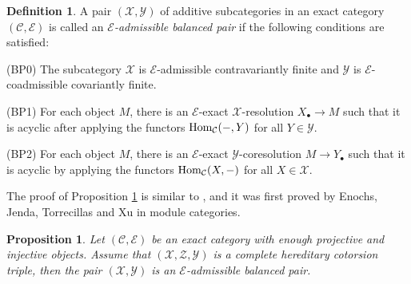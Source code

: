 \documentclass[reqno,12pt]{amsart}
\numberwithin{equation}{section}
\theoremstyle{plain}
\newtheorem{proposition}[theorem]{\bf Proposition}
\theoremstyle{definition}
\newtheorem{definition}[theorem]{\bf Definition}
\begin{document}
\begin{definition}
    A pair $(\mathcal{X},\mathcal{Y})$ of additive subcategories in an exact category
    $(\mathcal{C},\mathcal{E})$ is called an {\it $\mathcal{E}$-admissible balanced pair} if
    the following conditions are satisfied:

    {\rm (BP0)} The subcategory $\mathcal{X}$ is $\mathcal{E}$-admissible contravariantly
    finite and $\mathcal{Y}$ is $\mathcal{E}$-coadmissible covariantly finite.

    {\rm (BP1)} For each object $M$, there is an $\mathcal{E}$-exact $\mathcal{X}$-resolution
    $X_{\bullet}\to M$ such that it is acyclic after applying the functors
    $\mbox{\rm Hom}_{\mathcal{C}}(-,Y)$ for all $Y\in\mathcal{Y}$.

    {\rm (BP2)} For each object $M$, there is an $\mathcal{E}$-exact
    $\mathcal{Y}$-coresolution $M\to Y_{\bullet}$ such that it is acyclic by applying the
    functors $\mbox{\rm Hom}_{\mathcal{C}}(X,-)$ for all $X\in\mathcal{X}$.
\end{definition}
The proof of Proposition \ref{prop-2} is similar to \cite[Proposition 2.6]{C10}, and it was first proved by Enochs, Jenda, Torrecillas and Xu in module categories.
\begin{proposition}\label{prop-2}
    Let $(\mathcal{C},\mathcal{E})$ be an exact category with enough projective and injective
    objects. Assume that $(\mathcal{X},\mathcal{Z},\mathcal{Y})$ is a complete hereditary cotorsion triple, then the pair $(\mathcal{X},\mathcal{Y})$ is an
    $\mathcal{E}$-admissible balanced pair.
\end{proposition}
\end{document}
